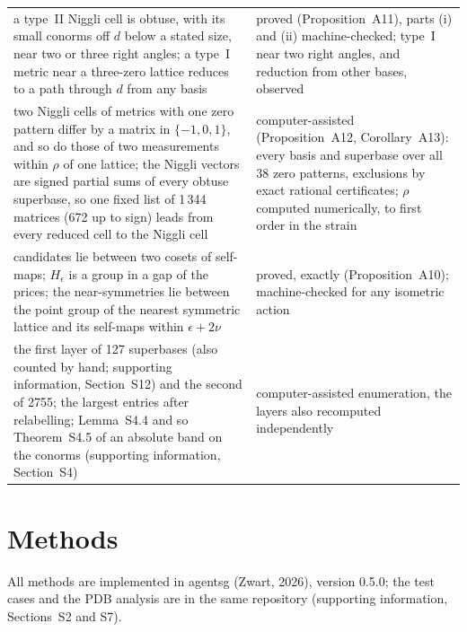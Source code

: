 \begin{widetable}
\begin{footnotesize}
\begin{tabular}{>{\raggedright\arraybackslash}p{9.6cm}>{\raggedright\arraybackslash}p{8.0cm}}
a type~II Niggli cell is obtuse, with its small conorms off $d$ below a stated size, near two or three right angles; a type~I metric near a three-zero lattice reduces to a path through $d$ from any basis & proved (Proposition~A11), parts (i) and (ii) machine-checked; type~I near two right angles, and reduction from other bases, observed \\
two Niggli cells of metrics with one zero pattern differ by a matrix in $\{-1,0,1\}$, and so do those of two measurements within $\rho$ of one lattice; the Niggli vectors are signed partial sums of every obtuse superbase, so one fixed list of 1\,344 matrices (672 up to sign) leads from every reduced cell to the Niggli cell & computer-assisted (Proposition~A12, Corollary~A13): every basis and superbase over all 38 zero patterns, exclusions by exact rational certificates; $\rho$ computed numerically, to first order in the strain \\
candidates lie between two cosets of self-maps; $H_\epsilon$ is a group in a gap of the prices; the near-symmetries lie between the point group of the nearest symmetric lattice and its self-maps within $\epsilon+2\nu$ & proved, exactly (Proposition~A10); machine-checked for any isometric action \\
the first layer of 127 superbases (also counted by hand; supporting information, Section~S12) and the second of 2755; the largest entries after relabelling; Lemma~S4.4 and so Theorem~S4.5 of an absolute band on the conorms (supporting information, Section~S4) & computer-assisted enumeration, the layers also recomputed independently \\
\bottomrule
\end{tabular}
\end{footnotesize}
\end{widetable}

\section{Methods}\label{sec:measured}

All methods are implemented in agentsg (Zwart, 2026), version 0.5.0; the test cases and the PDB analysis are in the same repository (supporting information, Sections~S2 and S7).

